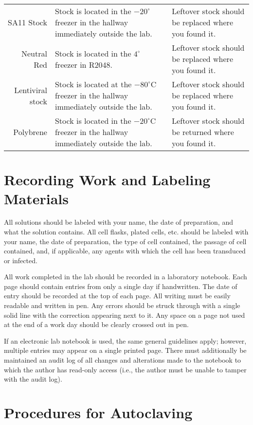 \begin{tabular*}{\textwidth}{r | p{2in} p{2in}}
SA11 Stock & Stock is located in the $-20^{\circ}$ freezer in the hallway immediately outside the lab. & Leftover stock should be replaced where you found it.\\
Neutral Red & Stock is located in the $4^{\circ}$ freezer in R2048. & Leftover stock should be replaced where you found it.\\
Lentiviral stock & Stock is located at the $-80^{\circ}$C freezer in the hallway immediately outside the lab. & Leftover stock should be replaced where you found it. \\
Polybrene & Stock is located in the $-20^{\circ}$C freezer in the hallway immediately outside the lab. & Leftover stock should be returned where you found it.\\
\hline
\end{tabular*}

\section{Recording Work and Labeling Materials}

All solutions should be labeled with your name, the date of preparation, and what the solution contains. All cell flasks, plated cells, etc. should be labeled with your name, the date of preparation, the type of cell contained, the passage of cell contained, and, if applicable, any agents with which the cell has been transduced or infected.

All work completed in the lab should be recorded in a laboratory notebook. Each page should contain entries from only a single day if handwritten. The date of entry should be recorded at the top of each page. All writing must be easily readable and written in pen. Any errors should be struck through with a single solid line with the correction appearing next to it. Any space on a page not used at the end of a work day should be clearly crossed out in pen.

If an electronic lab notebook is used, the same general guidelines apply; however, multiple entries may appear on a single printed page. There must additionally be maintained an audit log of all changes and alterations made to the notebook to which the author has read-only access (i.e., the author must be unable to tamper with the audit log).

\section{Procedures for Autoclaving}

